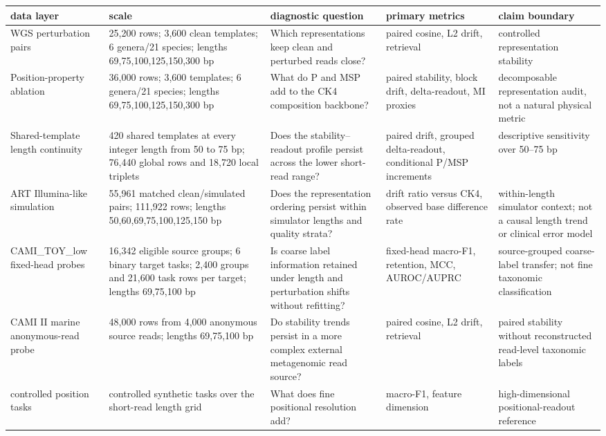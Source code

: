 \begin{tabular}{@{}p{}p{}p{}p{}p{}@{}}
\toprule
\textbf{data layer} & \textbf{scale} & \textbf{diagnostic question} & \textbf{primary metrics} & \textbf{claim boundary} \\
\midrule
WGS perturbation pairs & 25,200 rows; 3,600 clean templates; 6 genera/21 species; lengths 69,75,100,125,150,300 bp & Which representations keep clean and perturbed reads close? & paired cosine, L2 drift, retrieval & controlled representation stability \\
Position-property ablation & 36,000 rows; 3,600 templates; 6 genera/21 species; lengths 69,75,100,125,150,300 bp & What do P and MSP add to the CK4 composition backbone? & paired stability, block drift, delta-readout, MI proxies & decomposable representation audit, not a natural physical metric \\
Shared-template length continuity & 420 shared templates at every integer length from 50 to 75 bp; 76,440 global rows and 18,720 local triplets & Does the stability--readout profile persist across the lower short-read range? & paired drift, grouped delta-readout, conditional P/MSP increments & descriptive sensitivity over 50--75 bp \\
ART Illumina-like simulation & 55,961 matched clean/simulated pairs; 111,922 rows; lengths 50,60,69,75,100,125,150 bp & Does the representation ordering persist within simulator lengths and quality strata? & drift ratio versus CK4, observed base difference rate & within-length simulator context; not a causal length trend or clinical error model \\
CAMI\_TOY\_low fixed-head probes & 16,342 eligible source groups; 6 binary target tasks; 2,400 groups and 21,600 task rows per target; lengths 69,75,100 bp & Is coarse label information retained under length and perturbation shifts without refitting? & fixed-head macro-F1, retention, MCC, AUROC/AUPRC & source-grouped coarse-label transfer; not fine taxonomic classification \\
CAMI II marine anonymous-read probe & 48,000 rows from 4,000 anonymous source reads; lengths 69,75,100 bp & Do stability trends persist in a more complex external metagenomic read source? & paired cosine, L2 drift, retrieval & paired stability without reconstructed read-level taxonomic labels \\
controlled position tasks & controlled synthetic tasks over the short-read length grid & What does fine positional resolution add? & macro-F1, feature dimension & high-dimensional positional-readout reference \\

\end{tabular}
